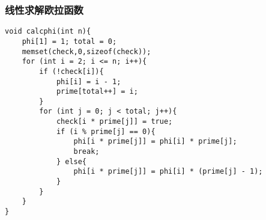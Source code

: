 \subsubsection{线性求解欧拉函数}
\begin{verbatim}
void calcphi(int n){
    phi[1] = 1; total = 0;
    memset(check,0,sizeof(check));
    for (int i = 2; i <= n; i++){
        if (!check[i]){
            phi[i] = i - 1;
            prime[total++] = i;
        }
        for (int j = 0; j < total; j++){
            check[i * prime[j]] = true;
            if (i % prime[j] == 0){
                phi[i * prime[j]] = phi[i] * prime[j];
                break;
            } else{
                phi[i * prime[j]] = phi[i] * (prime[j] - 1);
            }
        }
    }
}
\end{verbatim}
